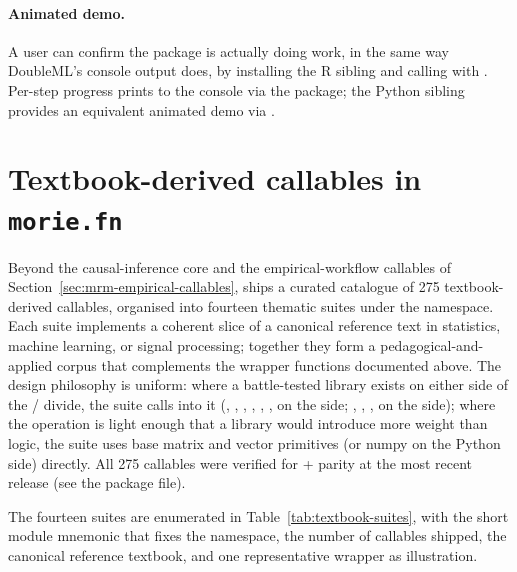 \documentclass[article,shortnames,nojss]{jss}
\begin{document}
\paragraph{Animated demo.}  A user can confirm the package is actually doing work, in the
same way DoubleML's console output does, by installing the R sibling and calling
 with .
Per-step progress prints to the console via the  package; the Python sibling provides an
equivalent animated demo via .

\section[Textbook-derived callables in morie.fn]{Textbook-derived callables in \texttt{morie.fn}}\label{sec:textbook-callables}

Beyond the causal-inference core and the empirical-workflow
callables of Section~\ref{sec:mrm-empirical-callables},
 ships a curated catalogue of 275 textbook-derived
callables, organised into fourteen thematic suites under the
 namespace.  Each suite implements a coherent
slice of a canonical reference text in statistics, machine
learning, or signal processing; together they form a
pedagogical-and-applied corpus that complements the wrapper
functions documented above.  The design philosophy is uniform:
where a battle-tested library exists on either side of the
/ divide, the suite calls into it
(, , , ,
, ,  on the
 side; , ,
,  on the 
side); where the operation is light enough that a library would
introduce more weight than logic, the suite uses base 
matrix and vector primitives (or numpy on the Python side)
directly.  All 275 callables were verified for  +
 parity at the most recent release (see the package
 file).

The fourteen suites are enumerated in
Table~\ref{tab:textbook-suites}, with the short module mnemonic
that fixes the namespace, the number of callables shipped, the
canonical reference textbook, and one representative
 wrapper as illustration.
\end{document}
